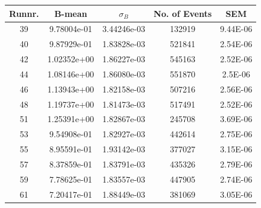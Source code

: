 \documentclass[12pt, letterpaper]{article}
\begin{document}
\begin{tabular}{|c|c|c|c|c|}
\hline
Runnr. & B-mean & $\sigma_{B}$ & No. of Events & SEM \\
\hline
39		&	9.78004e-01 &	3.44246e-03	&	132919	& 9.44E-06 \\
40		&	9.87929e-01	&	1.83828e-03	&	521841	& 2.54E-06 \\
42		&	1.02352e+00	&	1.86227e-03	&	545163	& 2.52E-06 \\
44		& 	1.08146e+00	&	1.86080e-03 &	551870	& 2.5E-06\\
46		&	1.13943e+00	&	1.82158e-03	& 	507216	& 2.56E-06\\
48		&	1.19737e+00	&	1.81473e-03	&	517491	& 2.52E-06\\
51		&	1.25391e+00 &	1.82867e-03	&	245708	& 3.69E-06\\
53		&	9.54908e-01	&	1.82927e-03	&	442614	& 2.75E-06\\
55		&	8.95591e-01	&	1.93142e-03	&	377027	& 3.15E-06\\
57		& 	8.37859e-01	&	1.83791e-03	&	435326	& 2.79E-06\\
59		&   7.78625e-01	&	1.83557e-03	&	447905	& 2.74E-06\\
61		&	7.20417e-01	&	1.88449e-03	&	381069	& 3.05E-06\\

\hline

\end{tabular}
\end{document}
